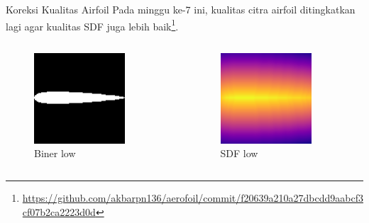 \begin{frame}{Koreksi Kualitas Airfoil}
  Pada minggu ke-7 ini, kualitas citra airfoil ditingkatkan lagi agar kualitas SDF juga lebih baik\footnote{\url{https://github.com/akbarpn136/aerofoil/commit/f20639a210a27dbcdd9aabcf3cf07b2ca2223d0d}}.

  \pause

  \begin{columns}[t]
    \begin{column}{.25\linewidth}
      \begin{figure}[h]
        \centering
        \includegraphics[width=0.8\linewidth]{statics/airfoil_low.png}
        \caption{Biner low}
      \end{figure}
    \end{column}

    \begin{column}{.25\linewidth}
      \begin{figure}[h]
        \centering
        \includegraphics[width=0.8\linewidth]{statics/airfoil_sdf_low.png}
        \caption{SDF low}
      \end{figure}
    \end{column}


\end{columns}
\end{frame}
